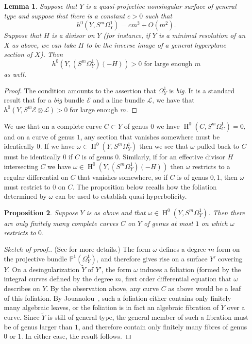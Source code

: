 \documentclass[12pt, reqno]{amsart}
\newtheorem{lemma}{Lemma}[section]
\newtheorem{prop}[lemma]{Proposition}
\theoremstyle{definition}
\newcommand{\PP}{{\mathbb P}}
\newcommand{\sE}{{\mathscr E}}
\newcommand{\sL}{{\mathscr L}}
\DeclareMathOperator{\HH}{H}
\numberwithin{equation}{section}
\numberwithin{table}{section}
\begin{document}
\begin{lemma}\label{L:also_hyperplane_vanishing}
Suppose that $Y$ is a quasi-projective nonsingular surface of general type and suppose that there is a constant $c>0$ such that
	\[h^0(Y,S^m\Omega^1_Y)=cm^3+O(m^2).\]
Suppose that $H$ is a divisor on $Y$ (for instance, if $Y$ is  a minimal resolution of an $X$ as above, we can take $H$ to be the inverse image of a general hyperplane section of $X$). Then
\[h^0(Y,(S^m\Omega^1_Y)(-H))>0 \text{ for large enough } m\]
as well.
\end{lemma}
\begin{proof}
The condition amounts to the assertion that $\Omega^1_Y$ is \emph{big}. It is a standard result that for a \emph{big} bundle $\sE$ and a line bundle $\sL$, we have that $h^0(Y,S^m\sE \otimes \sL)>0$ for large enough $m$.
\end{proof}

We use that on a complete curve $C\subset Y$ of genus $0$ we have $\HH^0(C,S^m\Omega^1_C)=0$, and on a curve of genus $1$, any section that vanishes somewhere must be identically $0$. If we have $\omega\in \HH^0(Y,S^m\Omega^1_Y)$ then we see that $\omega$ pulled back to $C$ must be identically $0$ if $C$ is of genus $0$. Similarly, if for an effective divisor $H$ intersecting $C$ we have $\omega\in\HH^0(Y,(S^m\Omega^1_Y)(-H))$ then 
$\omega$ restricts to a regular differential on $C$ that vanishes somewhere, so if $C$ is of genus $0,1$, then $\omega$ must restrict to $0$ on $C$. The proposition below recalls how the foliation determined by $\omega$ can be used to establish quasi-hyperbolicity.

\begin{prop}\label{P:foliation_quasihyperbolicity} Suppose $Y$ is as above and that $\omega\in\HH^0(Y,S^m\Omega^1_Y)$. Then there are only finitely many complete curves $C$ on $Y$ of genus at most $1$ on which $\omega$ restricts to $0$.
\end{prop}
\begin{proof}[Sketch of proof.]  (See \cite{Debarre2004} for more details.) The form $\omega$ defines a degree $m$ form on the projective bundle $\PP^1(\Omega^1_Y)$, and therefore gives rise on a surface $Y'$ covering $Y$. On a desingularization $\tilde{Y}$ of $Y'$, the form $\omega$ induces a foliation (formed by the integral curves defined by the degree $m$, first order differential equation that $\omega$ describes on $Y$. By the observation above, any curve $C$ as above would be a leaf of this foliation. By
Jouanolou~\cite{Jouanolou1978}, such a foliation either contains only finitely many algebraic leaves, or the foliation is in fact an algebraic fibration of $\tilde{Y}$ over a curve. Since $\tilde{Y}$ is still of general type, the general member of such a fibration must be of genus larger than $1$, and therefore contain only finitely many fibres of genus $0$ or $1$. In either case, the result follows.
\end{proof}
\end{document}
